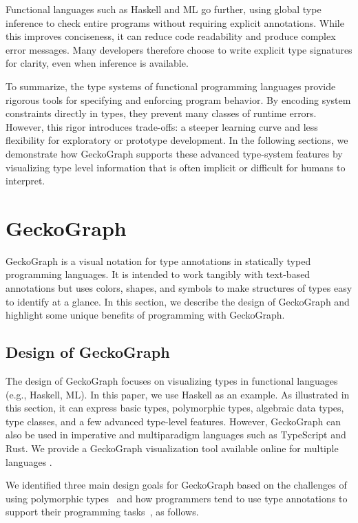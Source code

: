 \documentclass[preprint,12pt]{elsarticle}
\begin{document}
Functional languages such as Haskell and ML go further, using global type inference \cite{Damas1982-zw} to check entire programs without requiring explicit annotations. While this improves conciseness, it can reduce code readability and produce complex error messages. Many developers therefore choose to write explicit type signatures for clarity, even when inference is available.



To summarize, the type systems of functional programming languages provide rigorous tools for specifying and enforcing program behavior. By encoding system constraints directly in types, they prevent many classes of runtime errors. However, this rigor introduces trade-offs: a steeper learning curve and less flexibility for exploratory or prototype development. In the following sections, we demonstrate how GeckoGraph supports these advanced type-system features by visualizing type level information that is often implicit or difficult for humans to interpret.


\section{GeckoGraph}

GeckoGraph is a visual notation for type annotations in statically typed programming languages. It is intended to work tangibly with text-based annotations but uses colors, shapes, and symbols to make structures of types easy to identify at a glance. In this section, we describe the design of GeckoGraph and highlight some unique benefits of programming with GeckoGraph.

\subsection{Design of GeckoGraph}
The design of GeckoGraph focuses on visualizing types in functional languages (e.g., Haskell, ML). In this paper, we use Haskell as an example. As illustrated in this section, it can express basic types, polymorphic types, algebraic data types, type classes, and a few advanced type-level features. However, GeckoGraph can also be used in imperative and multiparadigm languages such as TypeScript and Rust. We provide a GeckoGraph visualization tool available online for multiple languages \cite{Fu2025-ka}.

We identified three main design goals for GeckoGraph based on the challenges of using polymorphic types~\cite{Jun2000-ec, Jun2000-yu} and how programmers tend to use type annotations to support their programming tasks~\cite{Justin_Lubin2021-yy}, as follows. 
\end{document}
